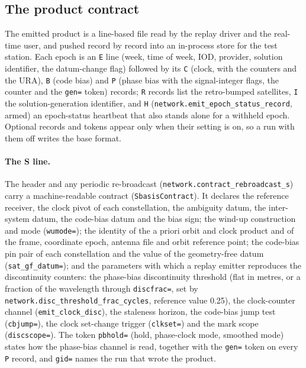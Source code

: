 \documentclass[main.tex]{subfiles}
\begin{document}
\subsection{The product contract}\label{sec:net-wire-contract}

The emitted product is a line-based file read by the replay driver and the
real-time user, and pushed record by record into an in-process store for
the test station. Each epoch is an \texttt{E} line (week, time of week,
IOD, provider, solution identifier, the datum-change flag) followed by its
\texttt{C} (clock, with the counters and the URA), \texttt{B} (code bias)
and \texttt{P} (phase bias with the signal-integer flags, the counter and
the \texttt{gen=} token) records; \texttt{R} records list the retro-bumped
satellites, \texttt{I} the solution-generation identifier, and \texttt{H}
(\texttt{network.emit\_epoch\_status\_record}, armed) an epoch-status
heartbeat that also stands alone for a withheld epoch. Optional records and
tokens appear only when their setting is on, so a run with them off writes
the base format.

\paragraph{The S line.}
The header and any periodic re-broadcast
(\texttt{network.contract\_rebroadcast\_s}) carry a machine-readable contract
(\texttt{SbasisContract}). It declares the reference receiver, the clock
pivot of each constellation, the ambiguity datum, the inter-system datum,
the code-bias datum and the bias sign; the wind-up construction and mode
(\texttt{wumode=}); the identity of the a priori orbit and clock product
and of the frame, coordinate epoch, antenna file and orbit reference
point; the code-bias pin pair of each constellation and the value of the
geometry-free datum (\texttt{sat\_gf\_datum=}); and the parameters with
which a replay emitter reproduces the discontinuity counters:
the phase-bias discontinuity threshold (flat in metres, or a fraction of
the wavelength through \texttt{discfrac=}, set by
\texttt{network.disc\_threshold\_frac\_cycles}, reference value 0.25), the
clock-counter channel (\texttt{emit\_clock\_disc}), the staleness horizon,
the code-bias jump test (\texttt{cbjump=}), the clock set-change trigger
(\texttt{clkset=}) and the mark scope (\texttt{discscope=}). The token
\texttt{pbhold=} (hold, phase-clock mode, smoothed mode) states how the
phase-bias channel is read, together with the \texttt{gen=} token on every
\texttt{P} record, and \texttt{gid=} names the run that wrote the product.
\end{document}
